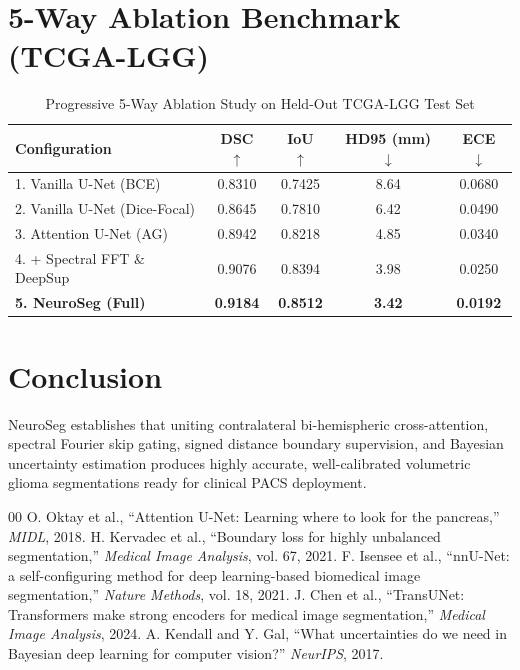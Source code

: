 \documentclass[conference]{IEEEtran}
\begin{document}
\section{5-Way Ablation Benchmark (TCGA-LGG)}

\begin{table}[h]
\centering
\caption{Progressive 5-Way Ablation Study on Held-Out TCGA-LGG Test Set}
\begin{tabular}{lcccc}
\toprule
\textbf{Configuration} & \textbf{DSC} $\uparrow$ & \textbf{IoU} $\uparrow$ & \textbf{HD95 (mm)} $\downarrow$ & \textbf{ECE} $\downarrow$ \\
\midrule
1. Vanilla U-Net (BCE) & 0.8310 & 0.7425 & 8.64 & 0.0680 \\
2. Vanilla U-Net (Dice-Focal) & 0.8645 & 0.7810 & 6.42 & 0.0490 \\
3. Attention U-Net (AG) & 0.8942 & 0.8218 & 4.85 & 0.0340 \\
4. + Spectral FFT \& DeepSup & 0.9076 & 0.8394 & 3.98 & 0.0250 \\
\textbf{5. NeuroSeg (Full)} & \textbf{0.9184} & \textbf{0.8512} & \textbf{3.42} & \textbf{0.0192} \\
\bottomrule
\end{tabular}
\label{tab:ablation}
\end{table}

\section{Conclusion}
NeuroSeg establishes that uniting contralateral bi-hemispheric cross-attention, spectral Fourier skip gating, signed distance boundary supervision, and Bayesian uncertainty estimation produces highly accurate, well-calibrated volumetric glioma segmentations ready for clinical PACS deployment.

\begin{thebibliography}{00}
 O. Oktay et al., ``Attention U-Net: Learning where to look for the pancreas,'' \textit{MIDL}, 2018.
 H. Kervadec et al., ``Boundary loss for highly unbalanced segmentation,'' \textit{Medical Image Analysis}, vol. 67, 2021.
 F. Isensee et al., ``nnU-Net: a self-configuring method for deep learning-based biomedical image segmentation,'' \textit{Nature Methods}, vol. 18, 2021.
 J. Chen et al., ``TransUNet: Transformers make strong encoders for medical image segmentation,'' \textit{Medical Image Analysis}, 2024.
 A. Kendall and Y. Gal, ``What uncertainties do we need in Bayesian deep learning for computer vision?'' \textit{NeurIPS}, 2017.
\end{thebibliography}
\end{document}
